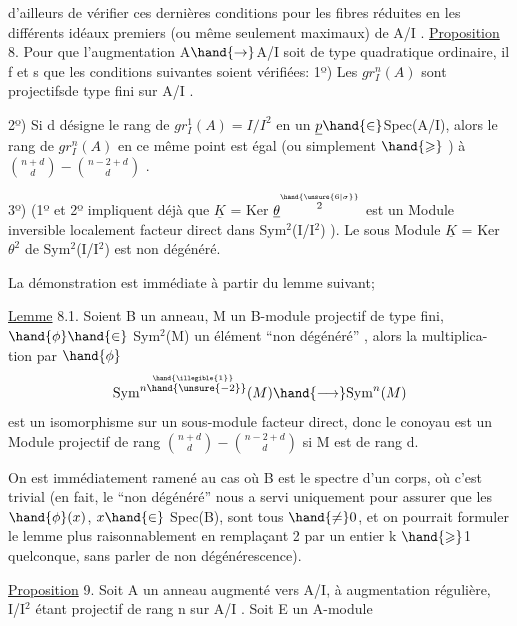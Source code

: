 \placedmargin{\unsure{$\diagup$}}
d'ailleurs de vérifier ces dernières conditions pour les fibres réduites
en les différents idéaux premiers (ou même seulement maximaux) de A/I .
\uline{Proposition} 8. Pour que l'augmentation A$\hand{\rightarrow}$A/I soit de type quadratique
ordinaire, il f et s que les conditions suivantes soient vérifiées:
1º)  Les $gr^{n}_{I}(A)$ sont projectifsde type fini sur A/I .

2º) Si d désigne le rang de $gr^{1}_{I}(A) = I/I^{2}$ en un $\underline{p} \hand{\in}$Spec(A/I),
alors le rang de $gr^{n}_{I}(A)$ en ce même point est égal (ou simplement
$\hand{\geqslant}$ ) à $\binom{n+d}{d} - \binom{n-2+d}{d}$ .

3º) (1º et 2º impliquent déjà que $\underline{K}$ = Ker $\underline{\theta}^{\overset{\hand{\unsure{6|\sigma}}}{2}}$ est un Module
inversible localement facteur direct dans  Sym$^{2}$(I/I$^{2}$) ). Le sous
Module $\underline{K}$ = Ker $\theta^{2}$ de Sym$^{2}$(I/I$^{2}$) est non dégénéré.

La démonstration est immédiate à partir du lemme suivant; 

 \uline{Lemme} 8.1. Soient B un anneau, M un B-module projectif de
type fini, $\hand{\phi} \hand{\in}$ Sym$^{2}$(M) un élément ``non dégénéré'' , alors la multiplica-%
tion par $\hand{\phi}$
\[ \mathrm{Sym}^{\overset{\hand{\illegible{1}}}{n\hand{\unsure{-2}}}}(M) \hand{\longrightarrow} \mathrm{Sym}^{n}(M) \]
est un isomorphisme sur un sous-module facteur direct, donc le conoyau
est un Module projectif de rang $\binom{n+d}{d} - \binom{n-2+d}{d}$ si M est de rang d.

On est immédiatement ramené au cas où B est le spectre d'un corps,
où c'est trivial (en fait, le ``non dégénéré'' nous a servi uniquement
\placedmargin{||} pour assurer que les $\hand{\phi}(x)$, $x \hand{\in}$ Spec(B), sont tous $\hand{\neq} 0$, et on pourrait
formuler le lemme plus raisonnablement en remplaçant 2 par un entier
k $\hand{\geqslant}$1 quelconque, sans parler de non dégénérescence).

\uline{Proposition} 9. Soit A un anneau augmenté vers A/I, à augmentation
régulière, I/I$^{2}$ étant projectif de rang n sur A/I . Soit E un A-module

